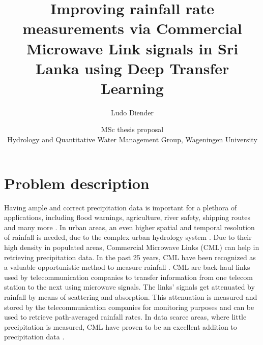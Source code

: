\documentclass[twocolumn, 10pt, a4paper]{article}
\begin{document}
	\title{\vspace{-1cm}\Huge{Improving rainfall rate measurements via Commercial Microwave Link signals in Sri Lanka using Deep Transfer Learning}}
	\author{\Large{Ludo Diender}}
	\date{\normalsize{MSc thesis proposal\\
			Hydrology and Quantitative Water Management Group,
			Wageningen University}}
	
	\maketitle
	
	\section{Problem description}
	
	Having ample and correct precipitation data is important for a plethora of applications, including flood warnings, agriculture, river safety, shipping routes and many more \cite{Chwala2019}. In urban areas, an even higher spatial and temporal resolution of rainfall is needed, due to the complex urban hydrology system \cite{Overeem2011}. Due to their high density in populated areas, Commercial Microwave Links (CML) can help in retrieving precipitation data. In the past 25 years, CML have been recognized as a valuable opportunistic method to measure rainfall \cite{Leijnse2007} \cite{Ruf1996}. CML are back-haul links used by telecommunication companies to transfer information from one telecom station to the next using microwave signals. The links' signals get attenuated by rainfall by means of scattering and absorption. This attenuation is measured and stored by the telecommunication companies for monitoring purposes and can be used to retrieve path-averaged rainfall rates. In data scarce areas, where little precipitation is measured, CML have proven to be an excellent addition to precipitation data \cite{Overeem2021,Doumounia2014,Diba2021}.   
	
\end{document}
